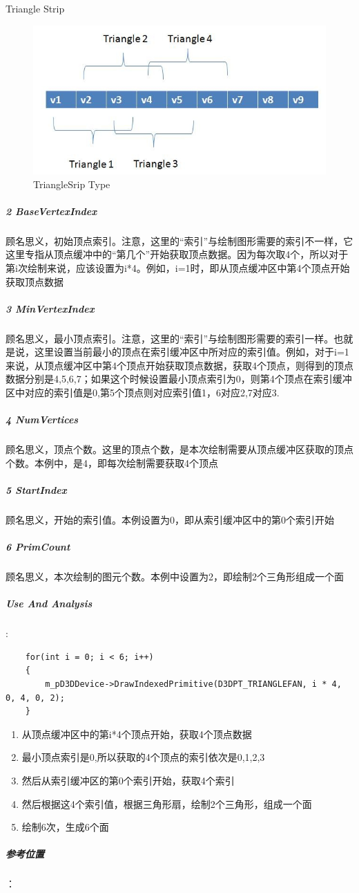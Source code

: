 \documentclass[UTF8,a4paper,8pt]{ctexart}
\begin{document}
			Triangle Strip	
				\begin{figure}[h]
					\centering
					\includegraphics{TriangleStrip.jpg}
					\caption{TriangleSrip  Type}
				\end{figure}
				
			\subparagraph{2 BaseVertexIndex}
				顾名思义，初始顶点索引。注意，这里的“索引”与绘制图形需要的索引不一样，它这里专指从顶点缓冲中的“第几个”开始获取顶点数据。因为每次取4个，所以对于第i次绘制来说，应该设置为i*4。例如，i=1时，即从顶点缓冲区中第4个顶点开始获取顶点数据
			
			\subparagraph{3 MinVertexIndex}
				顾名思义，最小顶点索引。注意，这里的“索引”与绘制图形需要的索引一样。也就是说，这里设置当前最小的顶点在索引缓冲区中所对应的索引值。例如，对于i=1来说，从顶点缓冲区中第4个顶点开始获取顶点数据，获取4个顶点，则得到的顶点数据分别是4,5,6,7；如果这个时候设置最小顶点索引为0，则第4个顶点在索引缓冲区中对应的索引值是0,第5个顶点则对应索引值1，6对应2,7对应3.
			
			\subparagraph{4 NumVertices}
				顾名思义，顶点个数。这里的顶点个数，是本次绘制需要从顶点缓冲区获取的顶点个数。本例中，是4，即每次绘制需要获取4个顶点
			
			\subparagraph{5 StartIndex}
				顾名思义，开始的索引值。本例设置为0，即从索引缓冲区中的第0个索引开始
			
			\subparagraph{6 PrimCount}
				顾名思义，本次绘制的图元个数。本例中设置为2，即绘制2个三角形组成一个面
			
			\subparagraph{Use And Analysis}:
				\begin{lstlisting}
	for(int i = 0; i < 6; i++)
	{
		m_pD3DDevice->DrawIndexedPrimitive(D3DPT_TRIANGLEFAN, i * 4, 0, 4, 0, 2);
	}				 
				\end{lstlisting}
				
				\begin{enumerate}[fullwidth,itemindent = 2em]
					\item 从顶点缓冲区中的第i*4个顶点开始，获取4个顶点数据
					\item 最小顶点索引是0,所以获取的4个顶点的索引依次是0,1,2,3
					\item 然后从索引缓冲区的第0个索引开始，获取4个索引
					\item 然后根据这4个索引值，根据三角形扇，绘制2个三角形，组成一个面
					\item 绘制6次，生成6个面
				\end{enumerate}
			\subparagraph{参考位置}：
			
\end{document}
